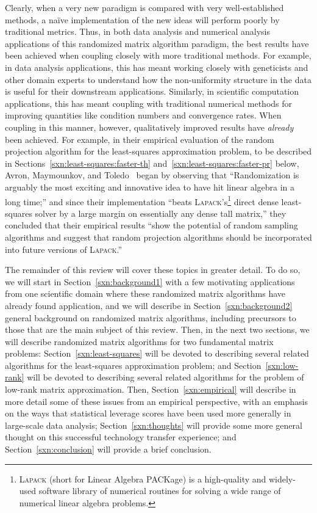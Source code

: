 \documentclass[twoside]{article}
\begin{document}
Clearly, when a very new paradigm is compared with very well-established 
methods, a na\"{i}ve implementation of the new ideas will perform poorly by 
traditional metrics.
Thus, in both data analysis and numerical analysis applications of this 
randomized matrix algorithm paradigm, the best results have been achieved 
when coupling closely with more traditional methods.
For example, in data analysis applications, this has meant working closely 
with geneticists and other domain experts to understand how the 
non-uniformity structure in the data is useful for their downstream 
applications.  
Similarly, in scientific computation applications, this has meant coupling
with traditional numerical methods for improving quantities like condition
numbers and convergence rates.
When coupling in this manner, however, qualitatively improved results have 
\emph{already} been achieved.
For example, in their empirical evaluation of the random projection algorithm 
for the least-squares approximation problem, to be described in 
Sections~\ref{sxn:least-squares:faster-th}
and~\ref{sxn:least-squares:faster-pr} below, Avron, Maymounkov, and 
Toledo~\cite{AMT10} began by observing that ``Randomization is arguably the 
most exciting and innovative idea to have hit linear algebra in a long 
time;'' and since their implementation ``beats \textsc{Lapack}'s\footnote{\textsc{Lapack} (short for Linear Algebra PACKage) is a 
high-quality and widely-used software library of numerical routines for 
solving a wide range of numerical linear algebra problems.} 
direct 
dense least-squares solver by a large margin on essentially any dense tall 
matrix,'' they concluded that their empirical results ``show the potential 
of random sampling algorithms and suggest that random projection algorithms 
should be incorporated into future versions of \textsc{Lapack}.''

The remainder of this review will cover these topics in greater detail.
To do so, we will start in Section~\ref{sxn:background1} with a few 
motivating applications from one scientific domain where these randomized 
matrix algorithms have already found application, and we will describe in
Section~\ref{sxn:background2} general background on randomized matrix 
algorithms, including precursors to those that are the main subject of this 
review.
Then, in the next two sections, we will describe randomized matrix algorithms
for two fundamental matrix problems: Section~\ref{sxn:least-squares} will 
be devoted to describing several related algorithms for the least-squares 
approximation problem; and Section~\ref{sxn:low-rank} will be devoted to 
describing several related algorithms for the problem of low-rank matrix 
approximation.
Then, Section~\ref{sxn:empirical} will describe in more detail some of these 
issues from an empirical perspective, with an emphasis on the ways that 
statistical leverage scores have been used more generally in large-scale 
data analysis; 
Section~\ref{sxn:thoughts} will provide some more general thought on this
successful technology transfer experience; and
Section~\ref{sxn:conclusion} will provide a brief conclusion.
\end{document}
